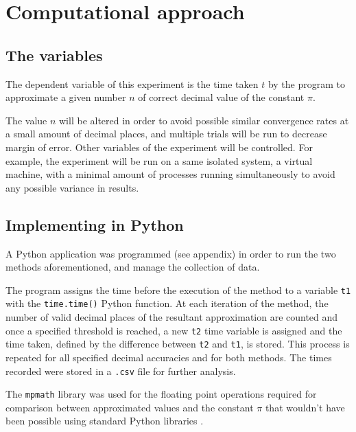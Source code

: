 \section{Computational approach}

\subsection{The variables}
The dependent variable of this experiment is the time taken $t$ by the program 
to approximate a given number $n$ of correct decimal value of the constant $\pi$.

The value $n$ will be altered in order to avoid possible similar convergence rates 
at a small amount of decimal places, and multiple trials will be run to decrease 
margin of error. Other variables of the experiment will be controlled. For example, the experiment 
will be run on a same isolated system, a virtual machine, with a minimal amount of 
processes running simultaneously to avoid any possible variance in results. 


\subsection{Implementing in Python}

A Python application was programmed (see appendix) in order to run the two 
methods aforementioned, and manage the collection of data. 

The program assigns the time before the execution of the method to a variable \verb|t1| 
with the \verb|time.time()| Python function. At each iteration of the method, the number of valid decimal 
places of the resultant approximation are counted and once a specified threshold is reached, 
a new \verb|t2| time variable is assigned and the time taken, defined by the difference between 
\verb|t2| and \verb|t1|, is stored. This process is repeated for all specified decimal accuracies and 
for both methods. The times recorded were stored in a \verb|.csv| file for further analysis. 

The \verb|mpmath| library was used for the floating point operations required 
for comparison between approximated values and the constant $\pi$ that wouldn't 
have been possible using standard Python libraries \cite{mpmath}. 